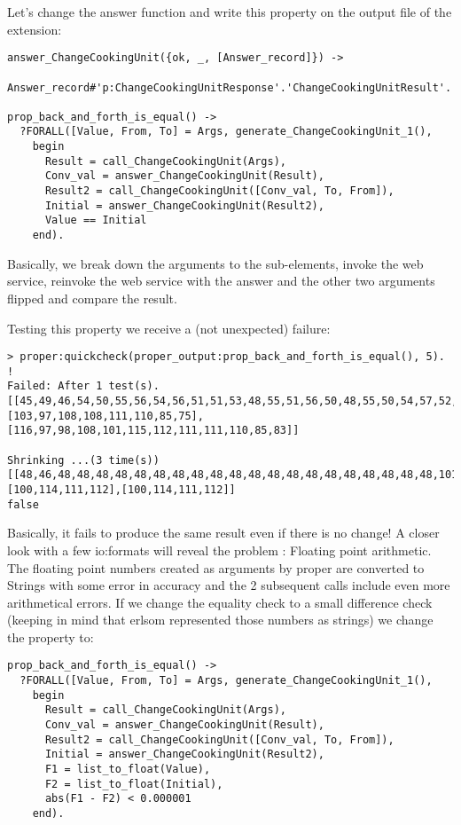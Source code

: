\documentclass[submission,copyright,a4]{eptcs}
\begin{document}
Let's change the answer function and write this property on the output file of the extension:

\begin{lstlisting}
answer_ChangeCookingUnit({ok, _, [Answer_record]}) -> 
  Answer_record#'p:ChangeCookingUnitResponse'.'ChangeCookingUnitResult'.

prop_back_and_forth_is_equal() ->
  ?FORALL([Value, From, To] = Args, generate_ChangeCookingUnit_1(),
    begin
      Result = call_ChangeCookingUnit(Args),
      Conv_val = answer_ChangeCookingUnit(Result),
      Result2 = call_ChangeCookingUnit([Conv_val, To, From]),
      Initial = answer_ChangeCookingUnit(Result2),
      Value == Initial
    end).
\end{lstlisting}

Basically, we break down the arguments to the sub-elements, invoke the web service, reinvoke the web service with the answer and the other two arguments flipped and compare the result. 

Testing this property we receive a (not unexpected) failure:

\begin{lstlisting}
> proper:quickcheck(proper_output:prop_back_and_forth_is_equal(), 5).
!
Failed: After 1 test(s).
[[45,49,46,54,50,55,56,54,56,51,51,53,48,55,51,56,50,48,55,50,54,57,52,101,45,48,49],[103,97,108,108,111,110,85,75],[116,97,98,108,101,115,112,111,111,110,85,83]]

Shrinking ...(3 time(s))
[[48,46,48,48,48,48,48,48,48,48,48,48,48,48,48,48,48,48,48,48,48,48,101,43,48,48],[100,114,111,112],[100,114,111,112]]
false
\end{lstlisting}

Basically, it fails to produce the same result even if there is no change! A closer look with a few io:formats will reveal the problem : Floating point arithmetic. The floating point numbers created as arguments by proper are converted to Strings with some error in accuracy and the 2 subsequent calls include even more arithmetical errors. If we change the equality check to a small difference check (keeping in mind that erlsom represented those numbers as strings) we change the property to:

\begin{lstlisting}
prop_back_and_forth_is_equal() ->
  ?FORALL([Value, From, To] = Args, generate_ChangeCookingUnit_1(),
    begin
      Result = call_ChangeCookingUnit(Args),
      Conv_val = answer_ChangeCookingUnit(Result),
      Result2 = call_ChangeCookingUnit([Conv_val, To, From]),
      Initial = answer_ChangeCookingUnit(Result2),
      F1 = list_to_float(Value),
      F2 = list_to_float(Initial),
      abs(F1 - F2) < 0.000001
    end).
\end{lstlisting}
\end{document}
